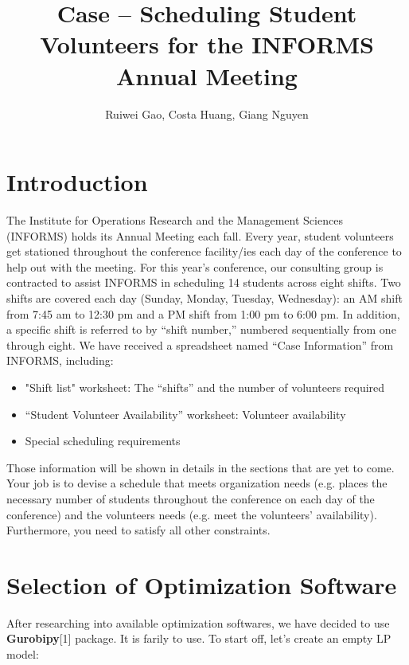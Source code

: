 \documentclass[11pt]{article}
\title{Case -- Scheduling Student Volunteers for the INFORMS Annual Meeting}
\author{Ruiwei Gao, Costa Huang, Giang Nguyen}
\providecommand{\tightlist}{%
      \setlength{\itemsep}{0pt}\setlength{\parskip}{0pt}}
\begin{document}
    
    
    \maketitle
    
    

    
    \section{Introduction}\label{introduction}

The Institute for Operations Research and the Management Sciences
(INFORMS) holds its Annual Meeting each fall. Every year, student
volunteers get stationed throughout the conference facility/ies each day
of the conference to help out with the meeting. For this year's
conference, our consulting group is contracted to assist INFORMS in
scheduling 14 students across eight shifts. Two shifts are covered each
day (Sunday, Monday, Tuesday, Wednesday): an AM shift from 7:45 am to
12:30 pm and a PM shift from 1:00 pm to 6:00 pm. In addition, a specific
shift is referred to by ``shift number,'' numbered sequentially from one
through eight. We have received a spreadsheet named ``Case Information''
from INFORMS, including:

\begin{itemize}
\tightlist
\item
  "Shift list" worksheet: The ``shifts'' and the number of volunteers
  required
\item
  ``Student Volunteer Availability'' worksheet: Volunteer availability
\item
  Special scheduling requirements
\end{itemize}

Those information will be shown in details in the sections that are yet
to come. Your job is to devise a schedule that meets organization needs
(e.g. places the necessary number of students throughout the conference
on each day of the conference) and the volunteers needs (e.g. meet the
volunteers' availability). Furthermore, you need to satisfy all other
constraints.

    \section{Selection of Optimization
Software}\label{selection-of-optimization-software}

After researching into available optimization softwares, we have decided
to use \textbf{Gurobipy}{[}1{]} package. It is farily to use. To start
off, let's create an empty LP model:
\end{document}
